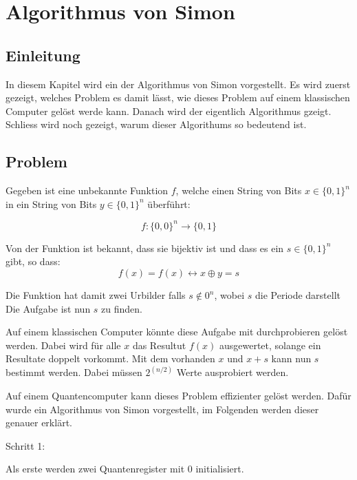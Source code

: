 \chapter{Algorithmus von Simon\label{chapter:simon}} 
\begin{refsection} 

\section{Einleitung} 

In diesem Kapitel wird ein der Algorithmus von Simon vorgestellt.  Es wird
zuerst gezeigt, welches Problem es damit lässt, wie dieses Problem auf einem
klassischen Computer gelöst werde kann.  Danach wird der eigentlich Algorithmus
gzeigt. Schliess wird noch gezeigt, warum dieser Algorithums so bedeutend ist.

\section{Problem} 

Gegeben ist eine unbekannte Funktion $f$, welche einen String
von Bits $x\in\{0,1\}^n$ in ein String von Bits $y\in\{0,1\}^n$ \"uberführt:

\[
    f\colon\{0,0\}^n\to\{0,1\} 
\]

Von der Funktion ist bekannt, dass sie bijektiv ist und dass es ein
$s\in\{0,1\}^n$ gibt, so dass: \[ f(x) = f(x) \leftrightarrow x \oplus y = s \]

Die Funktion hat damit zwei Urbilder falls $s \notin 0^n$, wobei $s$ die
Periode darstellt Die Aufgabe ist nun $s$ zu finden.

Auf einem klassischen Computer könnte diese Aufgabe mit durchprobieren gelöst
werden. Dabei wird für alle $x$ das Resultut $f(x)$ ausgewertet, solange ein
Resultate doppelt vorkommt. Mit dem vorhanden $x$ und $x + s$ kann nun $s$
bestimmt werden. Dabei müssen $2^(n/2)$ Werte ausprobiert werden.

Auf einem Quantencomputer kann dieses Problem effizienter gelöst werden. Dafür
wurde ein Algorithmus von Simon vorgestellt, im Folgenden werden dieser
genauer erklärt.



Schritt 1: 

Als erste werden zwei Quantenregister mit 0 initialisiert.


\end{refsection}
